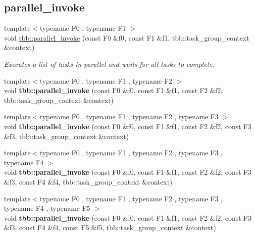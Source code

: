 \subsection*{parallel\+\_\+invoke}
\begin{DoxyCompactItemize}
\item 
{\footnotesize template$<$typename F0 , typename F1 $>$ }\\void \hyperlink{group__algorithms_ga14459dcbcd631194df803b155a7f610b}{tbb\+::parallel\+\_\+invoke} (const F0 \&f0, const F1 \&f1, tbb\+::task\+\_\+group\+\_\+context \&context)
\begin{DoxyCompactList}\small\item\em Executes a list of tasks in parallel and waits for all tasks to complete. \end{DoxyCompactList}\item 
\hypertarget{group__algorithms_gaaea3f3a8883128afb596a963e856277f}{}{\footnotesize template$<$typename F0 , typename F1 , typename F2 $>$ }\\void {\bfseries tbb\+::parallel\+\_\+invoke} (const F0 \&f0, const F1 \&f1, const F2 \&f2, tbb\+::task\+\_\+group\+\_\+context \&context)\label{group__algorithms_gaaea3f3a8883128afb596a963e856277f}

\item 
\hypertarget{group__algorithms_ga74932e64ede5047387108fa45f1af96f}{}{\footnotesize template$<$typename F0 , typename F1 , typename F2 , typename F3 $>$ }\\void {\bfseries tbb\+::parallel\+\_\+invoke} (const F0 \&f0, const F1 \&f1, const F2 \&f2, const F3 \&f3, tbb\+::task\+\_\+group\+\_\+context \&context)\label{group__algorithms_ga74932e64ede5047387108fa45f1af96f}

\item 
\hypertarget{group__algorithms_gaefc1ba8f73cbdd094575f6db454fc6b5}{}{\footnotesize template$<$typename F0 , typename F1 , typename F2 , typename F3 , typename F4 $>$ }\\void {\bfseries tbb\+::parallel\+\_\+invoke} (const F0 \&f0, const F1 \&f1, const F2 \&f2, const F3 \&f3, const F4 \&f4, tbb\+::task\+\_\+group\+\_\+context \&context)\label{group__algorithms_gaefc1ba8f73cbdd094575f6db454fc6b5}

\item 
\hypertarget{group__algorithms_ga3f02dfbb94238b2cf2ef8f20844b03af}{}{\footnotesize template$<$typename F0 , typename F1 , typename F2 , typename F3 , typename F4 , typename F5 $>$ }\\void {\bfseries tbb\+::parallel\+\_\+invoke} (const F0 \&f0, const F1 \&f1, const F2 \&f2, const F3 \&f3, const F4 \&f4, const F5 \&f5, tbb\+::task\+\_\+group\+\_\+context \&context)\label{group__algorithms_ga3f02dfbb94238b2cf2ef8f20844b03af}


\end{DoxyCompactItemize}
